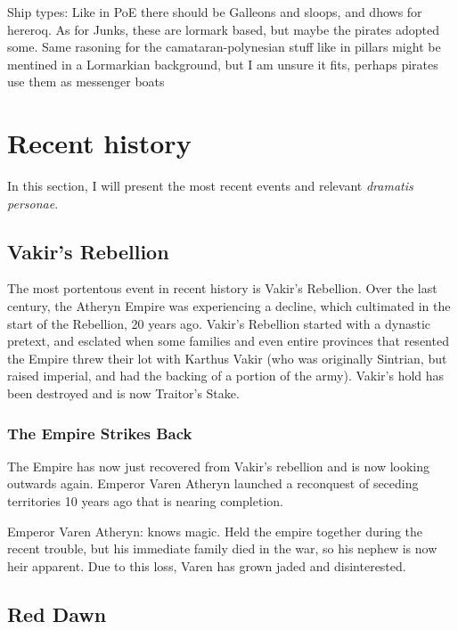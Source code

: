 Ship types:
	Like in PoE there should be Galleons and sloops, and dhows for hereroq.
	As for Junks, these are lormark based, but maybe the pirates adopted some. Same rasoning for the camataran-polynesian stuff like in pillars might be mentined in a Lormarkian background, but I am unsure it fits, perhaps pirates use them as messenger boats





\section{Recent history}

\label{recent_history}

In this section, I will present the most recent events and relevant \textit{dramatis personae}.

\subsection{Vakir's Rebellion}

The most portentous event in recent history is Vakir's Rebellion. Over the last century, the Atheryn Empire was experiencing a decline, which cultimated in the start of the Rebellion, 20 years ago. Vakir's Rebellion started with a dynastic pretext, and esclated when some families and even entire provinces that resented the Empire threw their lot with Karthus Vakir (who was originally Sintrian, but raised imperial, and had the backing of a portion of the army). Vakir's hold has been destroyed and is now Traitor's Stake.


\subsubsection{The Empire Strikes Back}

The Empire has now just recovered from Vakir's rebellion and is now looking outwards again. Emperor Varen Atheryn launched a reconquest of seceding territories 10 years ago that is nearing completion.


Emperor Varen Atheryn: knows magic. Held the empire together during the recent trouble, but his immediate family died in the war, so his nephew is now heir apparent. Due to this loss, Varen has grown jaded and disinterested.

\subsection{Red Dawn}

